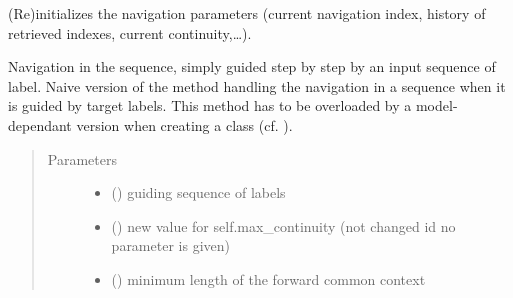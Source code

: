 \documentclass[letterpaper,10pt,english]{sphinxmanual}
\begin{document}
\begin{fulllineitems}
\begin{fulllineitems}
\begin{quote}
\begin{description}
\end{description}\end{quote}

\end{fulllineitems}


\begin{fulllineitems}
\label{\detokenize{index:Navigator.Navigator.reinit_navigation_param}}
(Re)initializes the navigation parameters (current navigation index, history of retrieved indexes, current continuity,…).

\end{fulllineitems}


\begin{fulllineitems}
\label{\detokenize{index:Navigator.Navigator.simply_guided_generation}}
Navigation in the sequence, simply guided step by step by an input sequence of label.
Naive version of the method handling the navigation in a sequence when it is guided by target labels. 
This method has to be overloaded by a model-dependant version when creating a  class (cf. ).
\begin{quote}\begin{description}
\item[{Parameters}] \leavevmode\begin{itemize}
\item {} 
 () \textendash{} guiding sequence of labels

\item {} 
 () \textendash{} new value for self.max\_continuity (not changed id no parameter is given)

\item {} 
 () \textendash{} minimum length of the forward common context


\end{itemize}
\end{description}
\end{quote}
\end{fulllineitems}
\end{fulllineitems}
\end{document}
